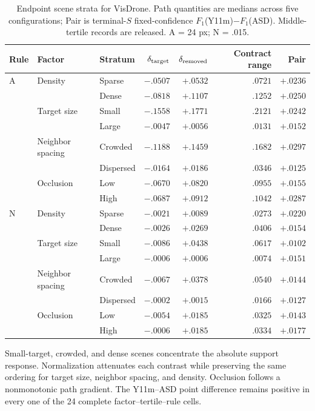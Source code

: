 \documentclass[journal]{IEEEtran}
\begin{document}
\begin{table}[!t]
\centering
\caption{Endpoint scene strata for VisDrone. Path quantities are medians across five configurations; Pair is terminal-$S$ fixed-confidence $F_1$(Y11m)$-F_1$(ASD). Middle-tertile records are released. A = 24 px; N = .015.}\label{tab:scene-strata}
\tiny
\setlength{\tabcolsep}{2.6pt}\renewcommand{\arraystretch}{.94}
\begin{tabular}{lllrrrr}
\toprule
Rule & Factor & Stratum & $\delta_{\rm target}$ & $\delta_{\rm removed}$ & Contract range & Pair\\
\midrule
A & Density & Sparse & $-.0507$ & $+.0532$ & $.0721$ & $+.0236$\\
  &         & Dense & $-.0818$ & $+.1107$ & $.1252$ & $+.0250$\\
  & Target size & Small & $-.1558$ & $+.1771$ & $.2121$ & $+.0242$\\
  &             & Large & $-.0047$ & $+.0056$ & $.0131$ & $+.0152$\\
  & Neighbor spacing & Crowded & $-.1188$ & $+.1459$ & $.1682$ & $+.0297$\\
  &                  & Dispersed & $-.0164$ & $+.0186$ & $.0346$ & $+.0125$\\
  & Occlusion & Low & $-.0670$ & $+.0820$ & $.0955$ & $+.0155$\\
  &           & High & $-.0687$ & $+.0912$ & $.1042$ & $+.0287$\\
\midrule
N & Density & Sparse & $-.0021$ & $+.0089$ & $.0273$ & $+.0220$\\
  &         & Dense & $-.0026$ & $+.0269$ & $.0406$ & $+.0154$\\
  & Target size & Small & $-.0086$ & $+.0438$ & $.0617$ & $+.0102$\\
  &             & Large & $-.0006$ & $+.0006$ & $.0074$ & $+.0151$\\
  & Neighbor spacing & Crowded & $-.0067$ & $+.0378$ & $.0540$ & $+.0144$\\
  &                  & Dispersed & $-.0002$ & $+.0015$ & $.0166$ & $+.0127$\\
  & Occlusion & Low & $-.0054$ & $+.0185$ & $.0325$ & $+.0143$\\
  &           & High & $-.0006$ & $+.0185$ & $.0334$ & $+.0177$\\
\bottomrule
\end{tabular}
\end{table}

Small-target, crowded, and dense scenes concentrate the absolute support response. Normalization attenuates each contrast while preserving the same ordering for target size, neighbor spacing, and density. Occlusion follows a nonmonotonic path gradient. The Y11m--ASD point difference remains positive in every one of the 24 complete factor--tertile--rule cells.
\end{document}
